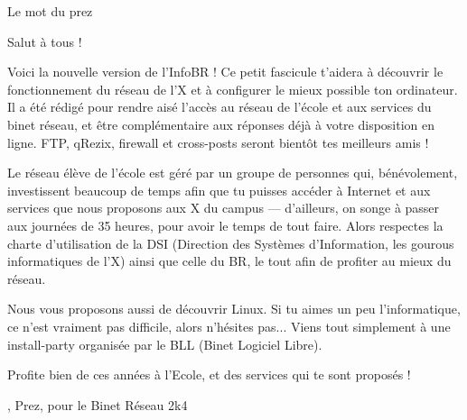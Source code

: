 \begin{center}
    { \LARGE Le mot du prez }
\end{center}

Salut \`a tous !

Voici la nouvelle version de l'InfoBR ! Ce petit fascicule t'aidera \`a d\'ecouvrir le fonctionnement du r\'eseau de l'X et \`a configurer le mieux possible ton ordinateur. Il a \'et\'e r\'edig\'e pour rendre ais\'e l'acc\`es au r\'eseau de l'\'ecole et aux services du binet r\'eseau, et \^etre compl\'ementaire aux r\'eponses d\'ej\`a \`a votre disposition en ligne. FTP, qRezix, firewall et cross-posts seront bient\^ot tes meilleurs amis !

Le r\'eseau \'el\`eve de l'\'ecole est g\'er\'e par un groupe de personnes qui, b\'en\'evolement, investissent beaucoup de temps afin que tu puisses acc\'eder \`a Internet et aux services que nous proposons aux X du campus --- d'ailleurs, on songe \`a passer aux journ\'ees de 35 heures, pour avoir le temps de tout faire. Alors respectes la charte d'utilisation de la DSI (Direction des Syst\`emes d'Information, les gourous informatiques de l'X) ainsi que celle du BR, le tout afin de profiter au mieux du r\'eseau.

Nous vous proposons aussi de d\'ecouvrir Linux. Si tu aimes un peu l'informatique, ce n'est vraiment pas difficile, alors n'h\'esites pas... Viens tout simplement \`a une install-party organis\'ee par le BLL (Binet Logiciel Libre).

Profite bien de ces ann\'ees \`a l'Ecole, et des services qui te
sont propos\'es !
\begin{flushright}
    , Prez, pour le Binet R\'eseau 2k4
\end{flushright}

